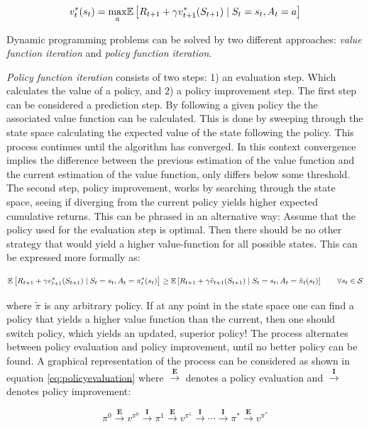 \begin{equation}
    v_t^{*}(s_t) = \underset{a}{\max}  \mathbb{E} \left[ R_{t+1} + \gamma v^{*}_{t+1}(S_{t+1}) \mid S_t = s_t, A_t = a\right] 
\end{equation}

Dynamic programming problems can be solved by two different approaches: \textit{value function iteration} and \textit{policy function iteration}.

\textit{Policy function iteration} consists of two steps: 1) an evaluation step. Which calculates the value of a policy, and 2) a policy improvement step.
The first step can be considered a prediction step. By following a given policy the the associated value function can be calculated. This is done by sweeping through the state space calculating the expected value of the state following the policy. This process continues until the algorithm has converged. In this context convergence implies the difference between the previous estimation of the value function and the current estimation of the value function, only differs below some threshold. The second step, policy improvement, works by searching through the state space, seeing if diverging from the current policy yields higher expected cumulative returns. This can be phrased in an alternative way: Assume that the policy used for the evaluation step is optimal. Then there should be no other strategy that would yield a higher value-function for all possible states. This can be expressed more formally as:

\begin{equation}
     \mathbb{E} \left[ R_{t+1} + \gamma v^{*}_{t+1}(S_{t+1}) \mid S_t = s_t, A_t = \pi_t^*(s_t) \right] \geq \mathbb{E} \left[ R_{t+1} + \gamma \tilde{v}_{t+1}(S_{t+1}) \mid S_t = s_t, A_t =\tilde{\pi}_t(s_t) \right] \qquad \forall s_t \in \mathcal{S}
\end{equation}

where $\tilde{\pi}$ is any arbitrary policy. If at any point in the state space one can find a policy that yields a higher value function than the current, then one should switch policy, which yields an updated, superior policy! The process alternates between policy evaluation and policy improvement, until no better policy can be found. A graphical representation of the process can be considered as shown in equation \eqref{eq:policyevaluation} where $\overset{\textbf{E}}{\longrightarrow}$ denotes a policy evaluation and $\overset{\textbf{I}}{\longrightarrow}$ denotes policy improvement:

\begin{equation}
    \label{eq:policyevaluation}
    \pi^0 \overset{\textbf{E}}{\longrightarrow}
    v^{\pi^0} \overset{\textbf{I}}{\longrightarrow} \pi^1 \overset{\textbf{E}}{\longrightarrow} v^{\pi^1} \overset{\textbf{I}}{\longrightarrow} \cdots \overset{\textbf{I}}{\longrightarrow} \pi^* \overset{\textbf{E}}{\longrightarrow} v^{\pi^*}
\end{equation}

